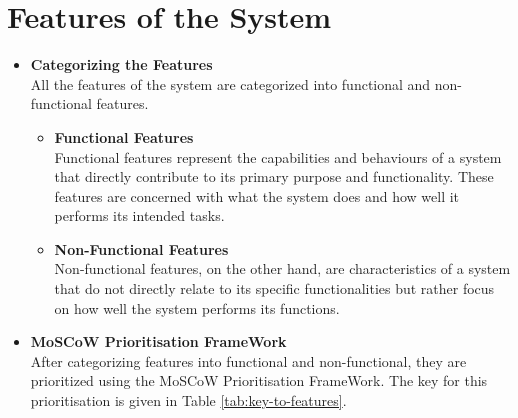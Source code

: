 \chapter{Features of the System}
\label{app:features}

\begin{itemize}
    \item \textbf{Categorizing the Features} \\
    All the features of the system are categorized into functional and non-functional features.
    \begin{itemize}
        \item \textbf{Functional Features} \\
    Functional features represent the capabilities and behaviours of a system that directly contribute to its primary purpose and functionality. These features are concerned with what the system does and how well it performs its intended tasks.

        \item \textbf{Non-Functional Features} \\
    Non-functional features, on the other hand, are characteristics of a system that do not directly relate to its specific functionalities but rather focus on how well the system performs its functions. 
    
    \end{itemize}
     	
    \item \textbf{MoSCoW Prioritisation FrameWork}\\
    After categorizing features into functional and non-functional, they are prioritized using the MoSCoW Prioritisation FrameWork. The key for this prioritisation is given in Table \ref{tab:key-to-features}.

    \end{itemize}

